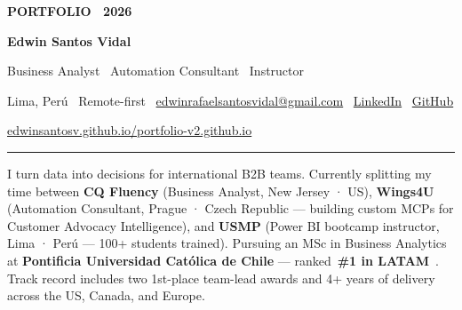 \documentclass[10pt,letterpaper]{article}
\newcommand{\accentchip}[1]{%
  \colorbox{chip}{\textcolor{accent}{\footnotesize\bfseries\,#1\,}}\hspace{1pt}
}
\begin{document}
\pagestyle{empty}
\color{ink}

\begin{center}
  \vspace*{20pt}
  {\color{accent}\sffamily\bfseries\scshape\small PORTFOLIO \textperiodcentered\ 2026}\par
  \vspace{18pt}
  {\Huge\bfseries Edwin Santos Vidal}\par
  \vspace{6pt}
  {\Large\textcolor{inkdim}{Business Analyst \textperiodcentered\ Automation Consultant \textperiodcentered\ Instructor}}\par
  \vspace{16pt}
  \textcolor{ink}{\small Lima, Perú \textperiodcentered\ Remote-first \textperiodcentered\
    \href{mailto:edwinrafaelsantosvidal@gmail.com}{edwinrafaelsantosvidal@gmail.com} \textperiodcentered\
    \href{https://www.linkedin.com/in/edwinsantosvidal/}{LinkedIn} \textperiodcentered\
    \href{https://github.com/edwinsantosv}{GitHub}
  }\par
  \vspace{10pt}
  \textcolor{accent}{\small\href{https://edwinsantosv.github.io/portfolio-v2.github.io/}{edwinsantosv.github.io/portfolio-v2.github.io}}
\end{center}

\vspace{12pt}
\textcolor{line}{\rule{\linewidth}{1pt}}
\vspace{10pt}

\noindent\textcolor{inkdim}{
  I turn data into decisions for international B2B teams. Currently splitting my time between
  \textbf{\color{ink}CQ Fluency} (Business Analyst, New Jersey · US),
  \textbf{\color{ink}Wings4U} (Automation Consultant, Prague · Czech Republic --- building custom MCPs for Customer Advocacy Intelligence), and
  \textbf{\color{ink}USMP} (Power BI bootcamp instructor, Lima · Perú --- 100+ students trained).
  Pursuing an MSc in Business Analytics at \textbf{\color{ink}Pontificia Universidad Católica de Chile}
  --- ranked \accentchip{\#1 in LATAM}. Track record includes two 1st-place team-lead awards and 4+ years
  of delivery across the US, Canada, and Europe.
}

\vspace{16pt}
\end{document}
